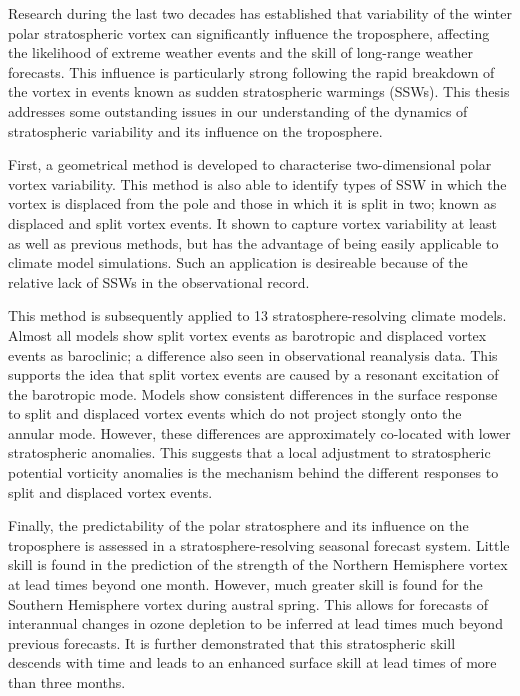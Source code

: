\begin{abstractseparate}

  Research during the last two decades has established that variability of the
  winter polar stratospheric vortex can significantly influence the troposphere,
  affecting the likelihood of extreme weather events and the skill of long-range
  weather forecasts. This influence is particularly strong following the rapid
  breakdown of the vortex in events known as sudden stratospheric warmings
  (SSWs). This thesis addresses some outstanding issues in our understanding of
  the dynamics of stratospheric variability and its influence on the
  troposphere.

  First, a geometrical method is developed to characterise two-dimensional polar
  vortex variability. This method is also able to identify types of SSW in which
  the vortex is displaced from the pole and those in which it is split in two;
  known as displaced and split vortex events. It shown to capture vortex
  variability at least as well as previous methods, but has the advantage of
  being easily applicable to climate model simulations. Such an application is
  desireable because of the relative lack of SSWs in the observational record.


  This method is subsequently applied to 13 stratosphere-resolving climate
  models. Almost all models show split vortex events as barotropic and displaced
  vortex events as baroclinic; a difference also seen in observational
  reanalysis data. This supports the idea that split vortex events are caused by
  a resonant excitation of the barotropic mode. Models show consistent
  differences in the surface response to split and displaced vortex events which
  do not project stongly onto the annular mode. However, these differences are
  approximately co-located with lower stratospheric anomalies. This suggests
  that a local adjustment to stratospheric potential vorticity anomalies is the
  mechanism behind the different responses to split and displaced vortex events.

  Finally, the predictability of the polar stratosphere and its influence on the
  troposphere is assessed in a stratosphere-resolving seasonal forecast
  system. Little skill is found in the prediction of the strength of the
  Northern Hemisphere vortex at lead times beyond one month. However, much
  greater skill is found for the Southern Hemisphere vortex during austral
  spring. This allows for forecasts of interannual changes in ozone depletion to
  be inferred at lead times much beyond previous forecasts. It is further
  demonstrated that this stratospheric skill descends with time and leads to an
  enhanced surface skill at lead times of more than three months. 
 



\end{abstractseparate}

